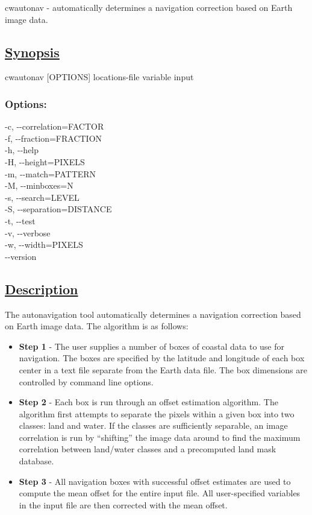    cwautonav - automatically determines a navigation correction based on Earth image data.  
\subsection*{\underline{Synopsis}}


 cwautonav [OPTIONS] locations-file variable input
\subsubsection*{Options:}


  -c, -{-}correlation=FACTOR \\ 
 -f, -{-}fraction=FRACTION \\ 
 -h, -{-}help \\ 
 -H, -{-}height=PIXELS \\ 
 -m, -{-}match=PATTERN \\ 
 -M, -{-}minboxes=N \\ 
 -s, -{-}search=LEVEL \\ 
 -S, -{-}separation=DISTANCE \\ 
 -t, -{-}test \\ 
 -v, -{-}verbose \\ 
 -w, -{-}width=PIXELS \\ 
 -{-}version \\ 

\subsection*{\underline{Description}}


 The autonavigation tool automatically determines a navigation correction based on Earth image data. The algorithm is as follows:
\begin{itemize}
\item \textbf{Step 1}
 - The user supplies a number of boxes of coastal data to use for navigation. The boxes are specified by the latitude and longitude of each box center in a text file separate from the Earth data file. The box dimensions are controlled by command line options.
\item \textbf{Step 2}
 - Each box is run through an offset estimation algorithm. The algorithm first attempts to separate the pixels within a given box into two classes: land and water. If the classes are sufficiently separable, an image correlation is run by ``shifting'' the image data around to find the maximum correlation between land/water classes and a precomputed land mask database.
\item \textbf{Step 3}
 - All navigation boxes with successful offset estimates are used to compute the mean offset for the entire input file. All user-specified variables in the input file are then corrected with the mean offset.

\end{itemize}


